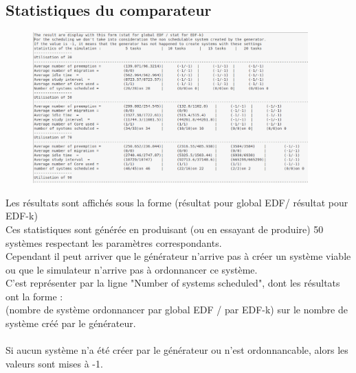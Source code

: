\documentclass[a4paper,10pt]{article}
\begin{document}
	  
	 \subsection{Statistiques du comparateur}
		\begin{figure}[H] \hspace*{-2cm} 
    	\centering
   		  \includegraphics[width=300pt]{stat2.png} 
	  	\end{figure}


		Les résultats sont affichés sous la forme (résultat pour global EDF/ résultat pour EDF-k)\\
		Ces statistiques sont générée en produisant (ou en essayant de produire) 50 systèmes respectant les paramètres correspondants.\\
		Cependant il peut arriver que le générateur n'arrive pas à créer un système viable ou que le simulateur n'arrive pas à ordonnancer ce système.\\
		C'est représenter par la ligne "Number of systems scheduled", dont les résultats ont la forme :\\
		(nombre de système ordonnancer par global EDF / par EDF-k) sur le nombre de système créé par le générateur.\\
		~\\
		Si aucun système n'a été créer par le générateur ou n'est ordonnancable, alors les valeurs sont mises à -1.
\end{document}
